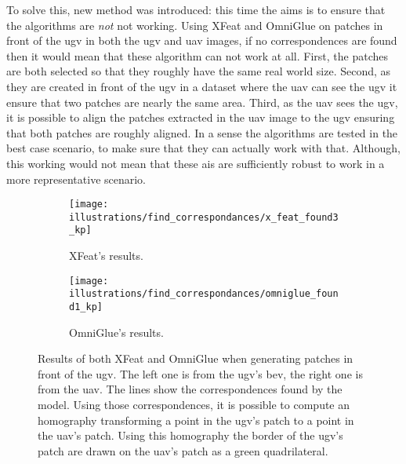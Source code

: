 To solve this, new method was introduced: this time the aims is to ensure that the algorithms are \textit{not} not working.
Using XFeat and OmniGlue on patches in front of the \gls{ugv} in both the \gls{ugv} and \gls{uav} images, if no correspondences
are found then it would mean that these algorithm can not work at all.
First, the patches are both selected so that they roughly have the same real world size.
Second, as they are created in front of the \gls{ugv} in a dataset where the \gls{uav} can see the \gls{ugv} it ensure
that two patches are nearly the same area.
Third, as the \gls{uav} sees the \gls{ugv}, it is possible to align the patches extracted in the \gls{uav} image to the
\gls{ugv} ensuring that both patches are roughly aligned.
In a sense the algorithms are tested in the best case scenario, to make sure that they can actually work with that.
Although, this working would not mean that these \gls{ai}s are sufficiently robust to work in a more representative scenario.

\begin{figure}[ht!]
    \centering
    \begin{subfigure}[t]{0.49\textwidth}
        \centering
        \texttt{[image: illustrations/find\_correspondances/x\_feat\_found3\_kp]}
        \caption{XFeat's results.}
        \label{fig:find_corr:along_traj:xfeat}
    \end{subfigure}
    \hfill
    \begin{subfigure}[t]{0.49\textwidth}
        \centering
        \texttt{[image: illustrations/find\_correspondances/omniglue\_found1\_kp]}
        \caption{OmniGlue's results.}
        \label{fig:find_corr:along_traj:omniglue}
    \end{subfigure}
    \caption{Results of both XFeat and OmniGlue when generating patches in front of the \gls{ugv}.
    The left one is from the \gls{ugv}'s bev, the right one is from the \gls{uav}.
    The lines show the correspondences found by the model.
    Using those correspondences, it is possible to compute an homography transforming a point in the \gls{ugv}'s patch
    to a point in the \gls{uav}'s patch.
    Using this homography the border of the \gls{ugv}'s patch are drawn on the \gls{uav}'s patch as a green quadrilateral.}
    \label{fig:find_corr:along_traj:results}
\end{figure}


